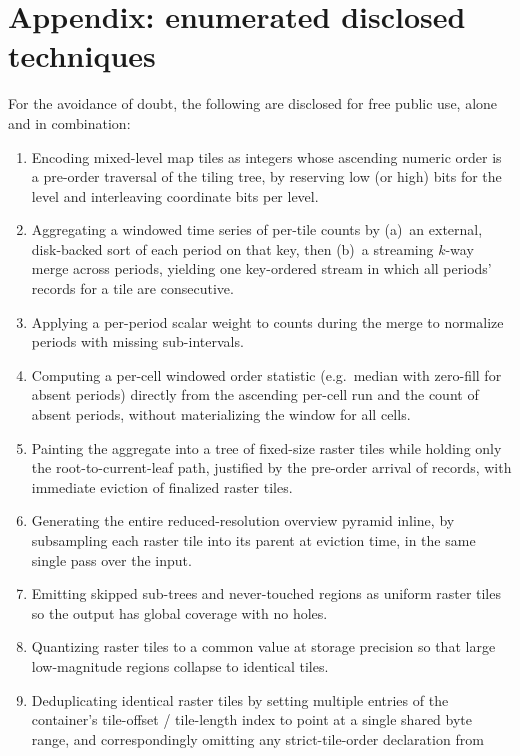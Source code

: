 \documentclass[10pt,twocolumn]{article}
\begin{document}
\section*{Appendix: enumerated disclosed techniques}

For the avoidance of doubt, the following are disclosed for free public use,
alone and in combination:

\begin{enumerate}
\item Encoding mixed-level map tiles as integers whose ascending numeric order
  is a pre-order traversal of the tiling tree, by reserving low (or high) bits
  for the level and interleaving coordinate bits per level.
\item Aggregating a windowed time series of per-tile counts by (a)~an external,
  disk-backed sort of each period on that key, then (b)~a streaming $k$-way
  merge across periods, yielding one key-ordered stream in which all periods'
  records for a tile are consecutive.
\item Applying a per-period scalar weight to counts during the merge to
  normalize periods with missing sub-intervals.
\item Computing a per-cell windowed order statistic (e.g.\ median with
  zero-fill for absent periods) directly from the ascending per-cell run and
  the count of absent periods, without materializing the window for all cells.
\item Painting the aggregate into a tree of fixed-size raster tiles while
  holding only the root-to-current-leaf path, justified by the pre-order
  arrival of records, with immediate eviction of finalized raster tiles.
\item Generating the entire reduced-resolution overview pyramid inline, by
  subsampling each raster tile into its parent at eviction time, in the same
  single pass over the input.
\item Emitting skipped sub-trees and never-touched regions as uniform raster
  tiles so the output has global coverage with no holes.
\item Quantizing raster tiles to a common value at storage precision so that
  large low-magnitude regions collapse to identical tiles.
\item Deduplicating identical raster tiles by setting multiple entries of the
  container's tile-offset / tile-length index to point at a single shared byte
  range, and correspondingly omitting any strict-tile-order declaration from

\end{enumerate}
\end{document}
